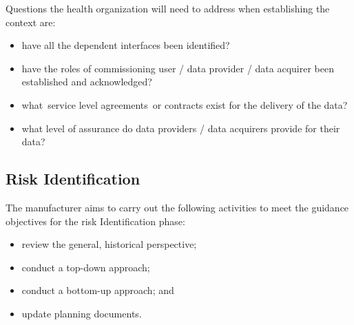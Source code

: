 Questions the health organization will need to address when establishing the context are:
\begin{itemize}
  \item have all the dependent interfaces been identified?
  \item have the roles of commissioning user / data provider / data acquirer been established and acknowledged?
  \item what\cbstart\ service level agreements\cbend\ or contracts exist for the delivery of the data?
  \item what level of assurance do data providers / data acquirers provide for their data?
\end{itemize}

\subsection{Risk Identification}
\begin{minipage}[t]{0.73\textwidth}
  The manufacturer aims to carry out the following activities to meet the guidance objectives for the risk Identification phase:
  \begin{itemize}
    \item review the general, historical perspective;
    \item conduct a top-down approach;
    \item conduct a bottom-up approach; and
    \item update planning documents.
  \end{itemize}
\end{minipage}
\begin{minipage}[t]{0.25\textwidth}
  \centering{}
\end{minipage}

